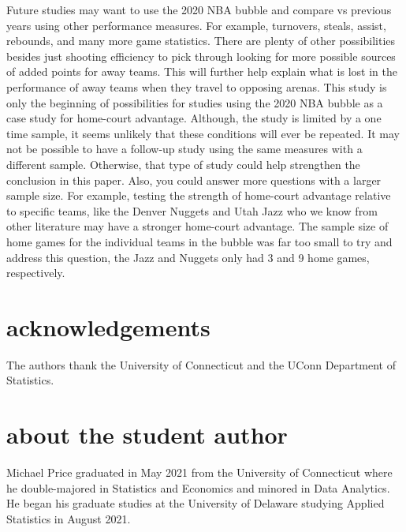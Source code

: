 \documentclass[10pt]{article}
\begin{document}
Future studies may want to use the 2020 NBA bubble and compare vs previous years
using other performance measures. For example, turnovers, steals, assist, rebounds,
and many more game statistics. There are plenty of other possibilities besides
just shooting efficiency to pick through looking for more possible sources of
added points for away teams. This will further help explain what is lost in the
performance of away teams when they travel to opposing arenas. This study is only
the beginning of possibilities for studies using the 2020 NBA bubble as a case study
for home-court advantage. Although, the study is limited by a one time
sample, it seems unlikely that these conditions will ever be
repeated. It may not be possible to have a follow-up study using the
same measures with a different sample. Otherwise, that type of study
could help strengthen the conclusion in this paper. Also, you could
answer more questions with a larger sample size. For example, testing
the strength of home-court advantage relative to specific teams, like the
Denver Nuggets and Utah Jazz who we know from other literature may
have a stronger home-court advantage. The sample size of home games
for the individual teams in the bubble was far too small to try and
address this question, the Jazz and Nuggets only had 3 and 9 home
games, respectively.





\section*{acknowledgements}
The authors thank the University of Connecticut and the UConn Department of Statistics.


\section*{about the student author}
Michael Price graduated in May 2021 from the University of Connecticut where he double-majored in Statistics and Economics and minored in Data Analytics. He began his graduate studies at the University of Delaware studying Applied Statistics in August 2021.
\end{document}
